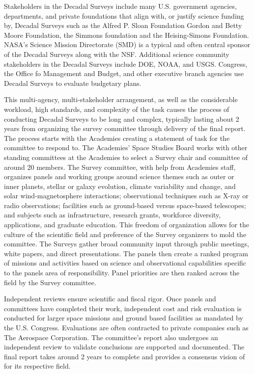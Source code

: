 \documentclass[preprint,12pt]{elsarticle}
\begin{document}
Stakeholders in the Decadal Surveys include many U.S. government agencies, departments, and private foundations that align with, or justify science funding by, Decadal Surveys such as the Alfred P. Sloan Foundation\cite{Sloan2021_decadal_private_funding} Gordon and Betty Moore Foundation\cite{Moore2017_hera_decadal_priority}, the Simmons foundation and the Heising-Simons Foundation\cite{NSF2023_advanced_simons_observatory}. NASA's Science Mission Directorate (SMD) is a typical and often central sponsor of the Decadal Surveys along with the NSF. Additional science community stakeholders in the Decadal Surveys include DOE, NOAA, and USGS. Congress, the Office fo Management and Budget, and other executive branch agencies use Decadal Surveys to evaluate budgetary plans.

This multi-agency, multi-stakeholder arrangement, as well as the considerable workload, high standards, and complexity of the task causes the process of conducting Decadal Surveys to be long and complex, typically lasting about 2 years from organizing the survey committee through delivery of the final report. The process starts with the Academies creating a statement of task for the committee to respond to. The Academies' Space Studies Board works with other standing committees at the Academies to select a Survey chair and committee of around 20 members. The Survey committee, with help from Academies staff, organizes panels and working groups around science themes such as outer or inner planets, stellar or galaxy evolution, climate variability and change, and solar wind-magnetosphere interactions; observational techniques such as X-ray or radio observations; facilities such as ground-based versus space-based telescopes; and subjects such as infrastructure, research grants, workforce diversity, applications, and graduate education. This freedom of organization allows for the culture of the scientific field and preference of the Survey organizers to mold the committee. The Surveys gather broad community input through public meetings, white papers, and direct presentations. The panels then create a ranked program of missions and activities based on science and observational capabilities specific to the panels area of responsibility. Panel priorities are then ranked across the field by the Survey committee. 

Independent reviews ensure scientific and fiscal rigor. Once panels and committees have completed their work, independent cost and risk evaluation is conducted for larger space missions and ground based facilities as mandated by the U.S. Congress. Evaluations are often contracted to private companies such as The Aerospace Corporation\cite{congress2008NASA}. The committee's report also undergoes an independent review to validate conclusions are supported and documented. The final report takes around 2 years to complete and provides a consensus vision of for its respective field.
\end{document}
